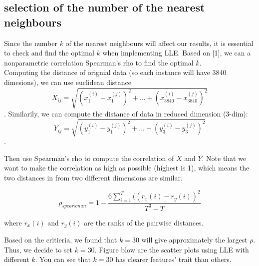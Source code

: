\documentclass{article}
\begin{document}
\subsection{selection of the number of the nearest neighbours}
Since the number $k$ of the nearest neighbours will affect our results, it is essential to check and find the optimal $k$ when implementing LLE. Based on [1], we can a nonparametric correlation Spearman's rho to find the optimal $k$. \\

Computing the distance of orignial data (so each instance will have 3840 dimesions), we can use euclidean distance \[X_{ij}=\sqrt{(x^{(i)}_1-x^{(j)}_1)^2+...+(x^{(i)}_{3840}-x^{(j)}_{3840})^2}\]. Similarily, we can compute the distance of data in reduced dimension (3-dim): \[Y_{ij}=\sqrt{(y^{(i)}_1-y^{(j)}_1)^2+...+(y^{(i)}_3-y^{(j)}_3)^2}\].

Then use Spearman's rho to compute the correlation of $X$ and $Y$. Note that we want to make the correlation as high as possible (highest is 1), which means the two distances in from two different dimensions are similar. 

\begin{equation}
\rho_{spearsman}=1-\dfrac{6\sum_{i=1}^T((r_x(i)-r_y(i))^2}{T^3-T}
\end{equation}

where $r_x(i)$ and $r_y(i)$ are the ranks of the pairwise distances. 

Based on the critieria, we found that $k=30$ will give approximately the largest $\rho$. Thus, we decide to set $k=30$. Figure blow are the scatter plots using LLE with different $k$. You can see that $k=30$ has clearer features' trait than others. 
\end{document}
